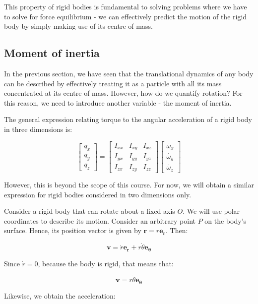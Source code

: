 \documentclass[12pt]{article}
\begin{document}
This property of rigid bodies is fundamental to solving problems where we have to solve for force equilibrium - we can effectively predict the motion of the rigid body by simply making use of its centre of mass.

\subsection{Moment of inertia}

In the previous section, we have seen that the translational dynamics of any body can be described by effectively treating it as a particle with all its mass concentrated at its centre of mass. However, how do we quantify rotation? For this reason, we need to introduce another variable - the moment of inertia.

The general expression relating torque to the angular acceleration of a rigid body in three dimensions is:

\[ 
\begin{bmatrix}
    q_x \\
    q_y \\
    q_z
\end{bmatrix} = 
\begin{bmatrix}
    I_{xx} & I_{xy} & I_{xz} \\
    I_{yx} & I_{yy} & I_{yz} \\
    I_{zx} & I_{zy} & I_{zz}
\end{bmatrix} \begin{bmatrix}
    \dot{\omega_x} \\
    \dot{\omega_y} \\
    \dot{\omega_z}
\end{bmatrix}
\]

However, this is beyond the scope of this course. For now, we will obtain a similar expression for rigid bodies considered in two dimensions only.

Consider a rigid body that can rotate about a fixed axis $O$. We will use polar coordinates to describe its motion. Consider an arbitrary point $P$ on the body's surface. Hence, its position vector is given by $\mathbf{r} = r\mathbf{e_r}$. Then:

\[ \mathbf{v} = \dot{r}\mathbf{e_r} + r\dot{\theta}\mathbf{e_{\theta}} \]

Since $\dot{r} = 0$, because the body is rigid, that means that:

\[ \mathbf{v} = r\dot{\theta}\mathbf{e_{\theta}} \]

Likewise, we obtain the acceleration:
\end{document}
